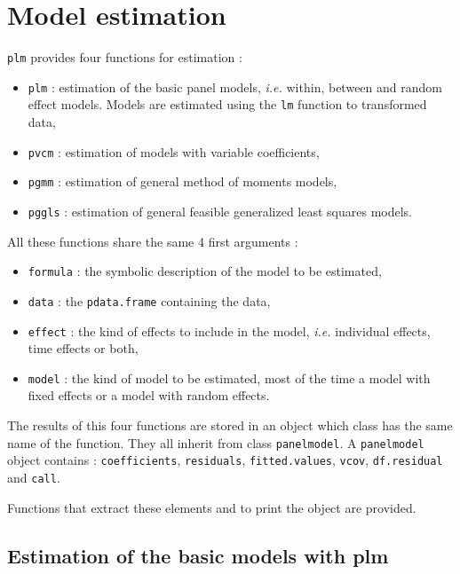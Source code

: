 \documentclass{article}
\begin{document}
\section{Model estimation}

\texttt{plm} provides four functions for estimation :

\begin{itemize}
\item \texttt{plm} : estimation of the
  basic panel models, \emph{i.e.} within, between and random effect
  models. Models are estimated using the \texttt{lm} function to
  transformed data,
\item \texttt{pvcm} : estimation of models with variable coefficients,
\item \texttt{pgmm} : estimation of general method of moments models,
\item \texttt{pggls} : estimation of general feasible generalized least squares
  models.
\end{itemize}

All these functions share the same 4 first arguments :

\begin{itemize}
\item \texttt{formula} : the symbolic description of the model to be estimated,
\item \texttt{data} : the \texttt{pdata.frame} containing the data,
\item \texttt{effect} : the kind of effects to include in the model,
  \emph{i.e.} individual effects, time effects or both,
\item \texttt{model} : the kind of model to be estimated, most of the
time a model with fixed effects or a model with random effects.
\end{itemize}

The results of this four functions are stored in an object which class has the
same name of the function. They all inherit from class \texttt{panelmodel}. A
\texttt{panelmodel} object contains : \texttt{coefficients},
\texttt{residuals}, \texttt{fitted.values}, \texttt{vcov},
\texttt{df.residual} and \texttt{call}.

Functions that extract these elements and to print the object are provided.




\subsection{Estimation of the basic models with plm}
\end{document}
